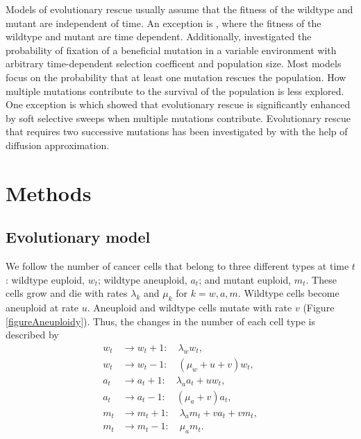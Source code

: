 \documentclass[12pt]{extarticle}
\begin{document}
Models of evolutionary rescue usually assume that the fitness of the wildtype and mutant are independent of time. An exception is \cite{marrec2020adapt}, where the fitness of the wildtype and mutant are time dependent. Additionally, \cite{uecker2011fixation} investigated the probability of fixation of a beneficial mutation in a variable environment with arbitrary time-dependent selection coefficent and population size.
Most models focus on the probability that at least one mutation rescues the population. How multiple mutations contribute to the survival of the population is less explored. One exception is \cite{wilson2017soft} which showed that evolutionary rescue is significantly enhanced by soft selective sweeps when multiple mutations contribute. 
Evolutionary rescue that requires two successive mutations has been investigated by \cite{martin2013probability} with the help of diffusion approximation.


\section*{Methods}
\subsection*{Evolutionary model}

We follow the number of cancer cells that belong to three different types at time $t$: wildtype euploid, $w_t$; wildtype aneuploid, $a_t$; and mutant euploid, $m_t$. 
These cells grow and die with rates $\lambda_k$ and $\mu_k$ for $k=w, a, m$.
Wildtype cells become aneuploid at rate $u$. Aneuploid and wildtype cells mutate with rate $v$ (Figure \ref{figureAneuploidy}). 
Thus, the changes in the number of each cell type is described by
\begin{subequations}
\begin{flalign}
w_t&\rightarrow w_t+1:\quad \lambda_ww_t,\\
w_t&\rightarrow w_t-1:\quad \left(\mu_w+u+v\right)w_t,\\
a_t&\rightarrow a_t+1:\quad \lambda_aa_t+uw_t,\\
a_t&\rightarrow a_t-1:\quad \left(\mu_a+v\right)a_t,\\
m_t&\rightarrow m_t+1:\quad \lambda_am_t+va_t+vm_t,\\
m_t&\rightarrow m_t-1:\quad \mu_am_t.
\end{flalign}
\end{subequations}
\end{document}
